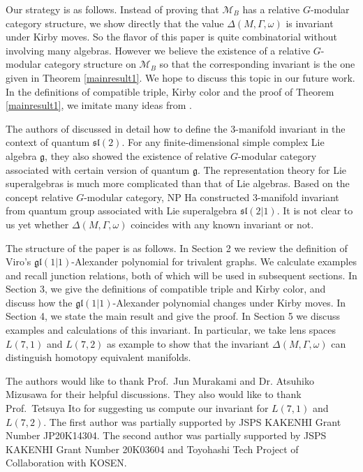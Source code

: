 \documentclass[12pt]{amsart}
\begin{document}
Our strategy is as follows. Instead of proving that $\mathcal{M}_B$ has a relative $G$-modular category structure, we show directly that the value $\Delta (M, \Gamma, \omega)$ is invariant under Kirby moves. So the flavor of this paper is quite combinatorial without involving many algebras. However we believe the existence of a relative $G$-modular category structure on $\mathcal{M}_B$ so that the corresponding invariant is the one given in Theorem \ref{mainresult1}. We hope to discuss this topic in our future work. In the definitions of compatible triple, Kirby color and the proof of Theorem \ref{mainresult1}, we imitate many ideas from \cite{MR3286896}. 

The authors of \cite{MR3286896} discussed in detail how to define the 3-manifold invariant in the context of quantum $\mathfrak{sl}(2)$. For any finite-dimensional simple complex Lie algebra $\mathfrak{g}$, they also showed the existence of relative $G$-modular category associated with certain version of quantum $\mathfrak{g}$. The representation theory for Lie superalgebras is much more complicated than that of Lie algebras. Based on the concept relative $G$-modular category, NP Ha \cite{MR3785790} constructed 3-manifold invariant from quantum group associated with Lie superalgebra $\mathfrak{sl}(2\vert 1)$. It is not clear to us yet whether $\Delta (M, \Gamma, \omega)$ coincides with any known invariant or not.

The structure of the paper is as follows. In Section 2 we review the definition of Viro's $\mathfrak{gl}(1\vert 1)$-Alexander polynomial for trivalent graphs. We calculate examples and recall junction relations, both of which will be used in subsequent sections. In Section 3, we give the definitions of compatible triple and Kirby color, and discuss how the $\mathfrak{gl}(1\vert 1)$-Alexander polynomial changes under Kirby moves. In Section 4, we state the main result and give the proof. In Section 5 we discuss examples and calculations of this invariant. In particular, we take lens spaces $L(7, 1)$ and $L(7, 2)$ as example to show that the invariant $\Delta (M, \Gamma, \omega)$ can distinguish homotopy equivalent manifolds. 

\medskip

The authors would like to thank Prof.~Jun Murakami and Dr. Atsuhiko Mizusawa for their helpful discussions. They also would like to thank Prof.~Tetsuya Ito for suggesting us compute our invariant for $L(7, 1)$ and $L(7, 2)$. The first author was partially supported by JSPS KAKENHI Grant Number JP20K14304. The second author was partially supported by JSPS KAKENHI Grant Number 20K03604 and Toyohashi Tech Project of Collaboration with KOSEN.
\end{document}
